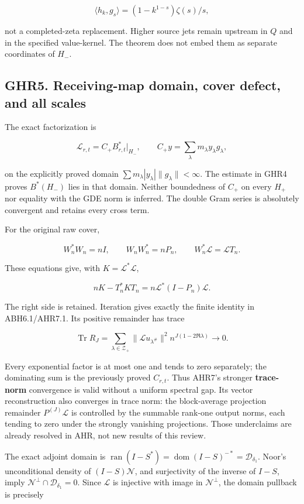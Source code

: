 \documentclass[
]{article}
\begin{document}
\[
\langle h_k,g_s\rangle=(1-k^{1-s})\zeta(s)/s,
\]

not a completed-zeta replacement. Higher source jets remain upstream in \(Q\) and in the specified value-kernel. The theorem does not embed them as separate coordinates of \(H_-\).

\subsection{GHR5. Receiving-map domain, cover defect, and all scales}\label{ghr5.-receiving-map-domain-cover-defect-and-all-scales}

The exact factorization is

\[
\mathcal L_{r,t}=C_+B_{r,t}^*|_{H_-},\qquad
C_+y=\sum_\lambda m_\lambda y_\lambda g_\lambda,
\]

on the explicitly proved domain \(\sum m_\lambda|y_\lambda|\|g_\lambda\|<\infty\). The estimate in GHR4 proves \(B^*(H_-)\) lies in that domain. Neither boundedness of \(C_+\) on every \(H_+\) nor equality with the GDE norm is inferred. The double Gram series is absolutely convergent and retains every cross term.

For the original raw cover,

\[
W_n^*W_n=nI,\qquad W_nW_n^*=nP_n,
\qquad W_n^*\mathcal L=\mathcal LT_n.
\]

These equations give, with \(K=\mathcal L^*\mathcal L\),

\[
nK-T_n^*KT_n=n\mathcal L^*(I-P_n)\mathcal L.
\]

The right side is retained. Iteration gives exactly the finite identity in ABH6.1/AHR7.1. Its positive remainder has trace

\[
\operatorname{Tr}R_J
=\sum_{\lambda\in\mathscr Z_+}
\|\mathcal Lu_{\lambda^\#}\|^2
n^{J(1-2\Re\lambda)}\longrightarrow0.
\]

Every exponential factor is at most one and tends to zero separately; the dominating sum is the previously proved \(C_{r,t}\). Thus AHR7's stronger \textbf{trace-norm} convergence is valid without a uniform spectral gap. Its vector reconstruction also converges in trace norm: the block-average projection remainder \(P^{(J)}\mathcal L\) is controlled by the summable rank-one output norms, each tending to zero under the strongly vanishing projections. Those underclaims are already resolved in AHR, not new results of this review.

The exact adjoint domain is \(\operatorname{ran}(I-S^*)=\operatorname{dom}(I-S)^{-*}=\mathcal D_{\delta_1}\). Noor's unconditional density of \((I-S)\mathcal N\), and surjectivity of the inverse of \(I-S\), imply \(\mathcal N^\perp\cap\mathcal D_{\delta_1}=0\). Since \(\mathcal L\) is injective with image in \(\mathcal N^\perp\), the domain pullback is precisely
\end{document}
